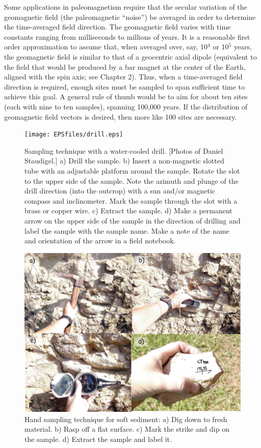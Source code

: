Some applications in paleomagnetism require that  
the secular variation of the geomagnetic field (the paleomagnetic ``noise'')
be averaged in order to determine the
 time-averaged field direction.  The geomagnetic field varies with
time constants ranging from milliseconds to millions of years.  It is a
reasonable first order approximation to assume that, when averaged 
over, say,
10$^4$ or 10$^5$  years, the geomagnetic field is similar to that of  a geocentric axial dipole 
(equivalent to the field that would be produced by 
a bar magnet at the center of the Earth, aligned with the spin axis;
see Chapter 2).
Thus, when a time-averaged field direction 
is required, enough sites must be sampled
to span sufficient time to achieve this goal.  A general rule of thumb would be to aim for  about ten
sites (each with nine to ten samples), spanning 100,000 years.   If the distribution of  geomagnetic field vectors is desired, then more like 100 sites are necessary.  

\begin{figure}[h!tb]
\centering  \texttt{[image: EPSfiles/drill.eps]}
\caption {Sampling technique with a water-cooled drill. [Photos of Daniel Staudigel.] a) Drill the
sample. b) Insert a non-magnetic slotted tube with an adjustable
 platform around the sample.  Rotate the slot to the upper side of the sample.
Note the azimuth and plunge of the drill direction (into the outcrop)
 with a sun and/or  magnetic compass 
and inclinometer.
 Mark the sample through the slot with a brass or copper wire.
c) Extract the sample.  d) Make a permanent arrow on the upper side of the
sample in the direction of
drilling and label the sample with the sample name. Make a note of the name
and orientation of the arrow in a field notebook. 
}
\label{fig:drill} 
\end{figure}


\begin{figure}[h!tb]
\centering  \includegraphics[width=11 cm]{EPSfiles/hand.eps}
\caption {Hand sampling technique for soft sediment:  a) Dig down to fresh material.  b)
Rasp off a flat surface. c) Mark the strike and dip on the sample. d)
Extract the sample and label it.}
\label{fig:hand}
\end{figure}


